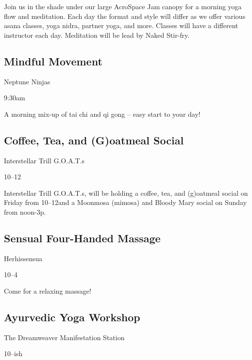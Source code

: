\begin{multicols}{2}
Join us in the shade under our large AcroSpace Jam canopy for a morning yoga flow and meditation. Each day the format and style will differ as we offer various asana classes, yoga nidra, partner yoga, and more. Classes will have a different instructor each day. Meditation will be lead by Naked Stir-fry. 



\subsection*{Mindful Movement}
\begin{description}[leftmargin=6em,noitemsep,style=nextline]
	\item[Camp:] Neptune Ninjas
  \item[Times:] 9:30am
\end{description}

A morning mix-up of tai chi and qi gong – easy start to your day!

\subsection*{Coffee, Tea, and (G)oatmeal Social}
\begin{description}[leftmargin=6em,noitemsep,style=nextline]
	\item[Camp:] Interstellar Trill G.O.A.T.s
  \item[Times:] 10\am--12\pm
\end{description}

Interstellar Trill G.O.A.T.s, will be holding a coffee, tea, and (g)oatmeal social on Friday from 10\am--12\pm and a Moonmosa (mimosa) and Bloody Mary social on Sunday from noon-3p.

\subsection*{Sensual Four-Handed Massage}
\begin{description}[leftmargin=6em,noitemsep,style=nextline]
	\item[Camp:] Herhissensua
  \item[Times:] 10\am--4\pm
\end{description}

Come for a relaxing massage!

\subsection*{Ayurvedic Yoga Workshop}
\begin{description}[leftmargin=6em,noitemsep,style=nextline]
	\item[Camp:] The Dreamweaver Manifestation Station
    \item[Times:] 10\am--ish
\end{description}


\end{multicols}
